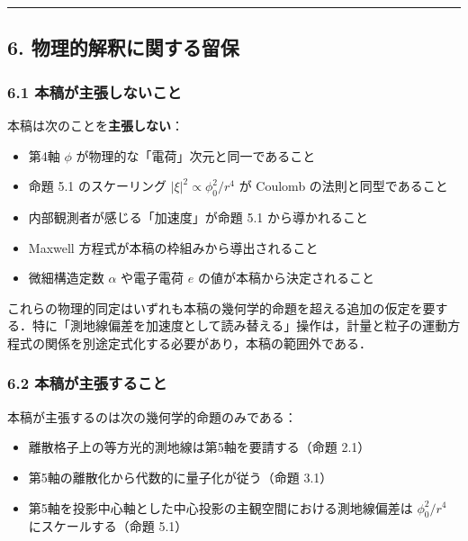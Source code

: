 \documentclass[a4paper,11pt]{ltjsarticle}
\theoremstyle{definition}
\begin{document}
\begin{center}\rule{0.5\linewidth}{0.5pt}\end{center}

\subsection{6. 物理的解釈に関する留保}\label{ux7269ux7406ux7684ux89e3ux91c8ux306bux95a2ux3059ux308bux7559ux4fdd}

\subsubsection{6.1 本稿が主張しないこと}\label{ux672cux7a3fux304cux4e3bux5f35ux3057ux306aux3044ux3053ux3068}

本稿は次のことを\textbf{主張しない}：

\begin{itemize}
\tightlist
\item
  第4軸 \(\phi\) が物理的な「電荷」次元と同一であること
\item
  命題 5.1 のスケーリング \(|\xi|^2 \propto \phi_0^2/r^4\) が Coulomb の法則と同型であること
\item
  内部観測者が感じる「加速度」が命題 5.1 から導かれること
\item
  Maxwell 方程式が本稿の枠組みから導出されること
\item
  微細構造定数 \(\alpha\) や電子電荷 \(e\) の値が本稿から決定されること
\end{itemize}

これらの物理的同定はいずれも本稿の幾何学的命題を超える追加の仮定を要する．特に「測地線偏差を加速度として読み替える」操作は，計量と粒子の運動方程式の関係を別途定式化する必要があり，本稿の範囲外である．

\subsubsection{6.2 本稿が主張すること}\label{ux672cux7a3fux304cux4e3bux5f35ux3059ux308bux3053ux3068}

本稿が主張するのは次の幾何学的命題のみである：

\begin{itemize}
\tightlist
\item
  離散格子上の等方光的測地線は第5軸を要請する（命題 2.1）
\item
  第5軸の離散化から代数的に量子化が従う（命題 3.1）
\item
  第5軸を投影中心軸とした中心投影の主観空間における測地線偏差は \(\phi_0^2/r^4\) にスケールする（命題 5.1）
\end{itemize}
\end{document}
